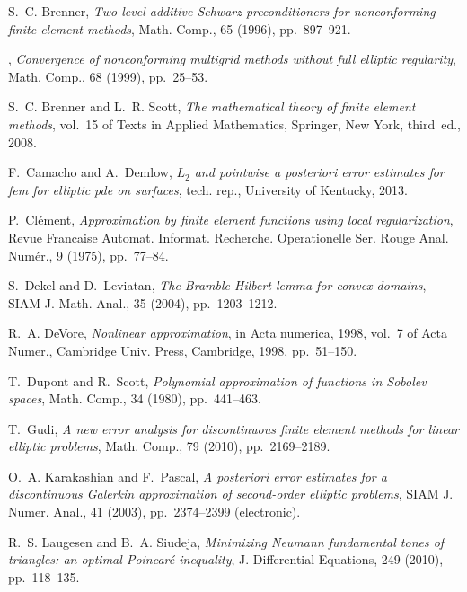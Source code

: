\documentclass[a4paper]{amsart}
\numberwithin{equation}{section}
\theoremstyle{plain}
\theoremstyle{definition}
\begin{document}
\begin{thebibliography}{10}
{\sc S.~C. Brenner}, {\em Two-level additive {S}chwarz preconditioners for
  nonconforming finite element methods}, Math. Comp., 65 (1996), pp.~897--921.

\leavevmode\vrule height 2pt depth -1.6pt width 23pt, {\em Convergence of
  nonconforming multigrid methods without full elliptic regularity}, Math.
  Comp., 68 (1999), pp.~25--53.

{\sc S.~C. Brenner and L.~R. Scott}, {\em The mathematical theory of finite
  element methods}, vol.~15 of Texts in Applied Mathematics, Springer, New
  York, third~ed., 2008.

{\sc F.~Camacho and A.~Demlow}, {\em {$L_2$} and pointwise a posteriori error
  estimates for fem for elliptic pde on surfaces}, tech. rep., University of
  Kentucky, 2013.

{\sc P.~Cl\'{e}ment}, {\em Approximation by finite element functions using
  local regularization}, Revue Francaise Automat. Informat. Recherche.
  Operationelle Ser. Rouge Anal. Num\'{e}r., 9 (1975), pp.~77--84.

{\sc S.~Dekel and D.~Leviatan}, {\em The {B}ramble-{H}ilbert lemma for convex
  domains}, SIAM J. Math. Anal., 35 (2004), pp.~1203--1212.

{\sc R.~A. DeVore}, {\em Nonlinear approximation}, in Acta numerica, 1998,
  vol.~7 of Acta Numer., Cambridge Univ. Press, Cambridge, 1998, pp.~51--150.

{\sc T.~Dupont and R.~Scott}, {\em Polynomial approximation of functions in
  {S}obolev spaces}, Math. Comp., 34 (1980), pp.~441--463.

{\sc T.~Gudi}, {\em A new error analysis for discontinuous finite element
  methods for linear elliptic problems}, Math. Comp., 79 (2010),
  pp.~2169--2189.

{\sc O.~A. Karakashian and F.~Pascal}, {\em A posteriori error estimates for a
  discontinuous {G}alerkin approximation of second-order elliptic problems},
  SIAM J. Numer. Anal., 41 (2003), pp.~2374--2399 (electronic).

{\sc R.~S. Laugesen and B.~A. Siudeja}, {\em Minimizing {N}eumann fundamental
  tones of triangles: an optimal {P}oincar\'e inequality}, J. Differential
  Equations, 249 (2010), pp.~118--135.


\end{thebibliography}
\end{document}
